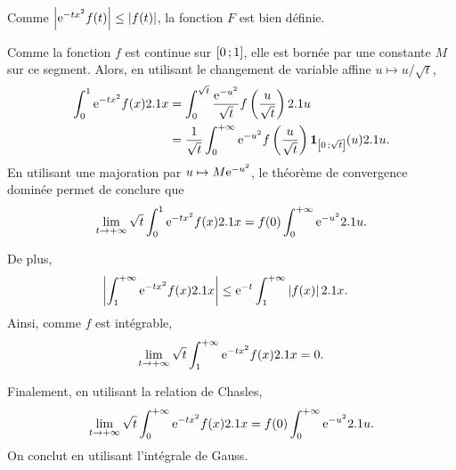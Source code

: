 \begin{demo}
\begin{reponses}
\item Comme $\left| \mathrm{e}^{-t x^2} f(t) \right| \leq \left| f(t) \right|$, la fonction $F$ est bien définie.

\item Comme la fonction $f$ est continue sur $\left[0\,;1\right]$, elle est bornée par une constante $M$ sur ce segment. Alors, en utilisant le changement de variable affine $u \mapsto u/\sqrt{t}$,
\begin{align*}
\int_0^1 \mathrm{e}^{-t x^2} f(x) 2.1 x
&= \int_0^{\sqrt{t}} \frac{\mathrm{e}^{-u^2}}{\sqrt{t}} f\left(\frac{u}{\sqrt{t}}\right) 2.1 u\\
&= \frac{1}{\sqrt{t}} \int_0^{+\infty} \mathrm{e}^{-u^2} f\left(\frac{u}{\sqrt{t}}\right) \mathbf{1}_{\left[0\,;\sqrt{t}\right]}(u) 2.1 u.
\end{align*}
En utilisant une majoration par $u \mapsto M \mathrm{e}^{-u^2}$, le théorème de convergence dominée permet de conclure que
\[
\lim_{t\to+\infty} \sqrt{t} \int_0^1 \mathrm{e}^{-t x^2} f(x) 2.1 x = f(0) \int_0^{+\infty} \mathrm{e}^{-u^2} 2.1 u.
\]

\item De plus,
\begin{align*}
\left| \int_1^{+\infty} \mathrm{e}^{-t x^2} f(x) 2.1 x \right|
&\leq \mathrm{e}^{-t} \int_1^{+\infty} \left| f(x) \right| 2.1 x.
\end{align*}
Ainsi, comme $f$ est intégrable,
\[
\lim_{t\to+\infty} \sqrt{t} \int_1^{+\infty} \mathrm{e}^{-t x^2} f(x) 2.1 x = 0.
\]

\item Finalement, en utilisant la relation de Chasles,
\[
\lim_{t\to+\infty} \sqrt{t} \int_0^{+\infty} \mathrm{e}^{-t x^2} f(x) 2.1 x = f(0) \int_0^{+\infty} \mathrm{e}^{-u^2} 2.1 u.
\]
On conclut en utilisant l'intégrale de Gauss.
\end{reponses}
\end{demo}

